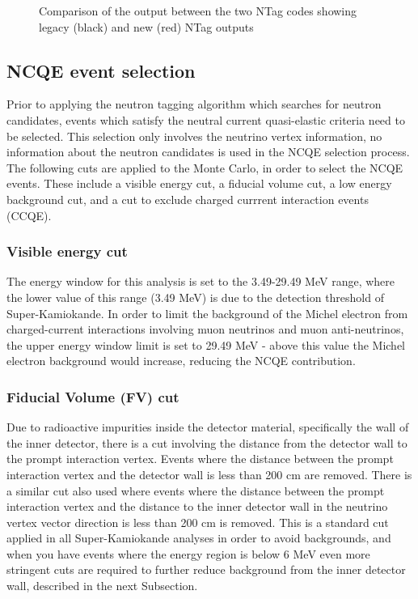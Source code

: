 \begin{figure}[t!]
 
    \caption{Comparison of the output between the two NTag codes showing legacy (black) and new (red) NTag outputs}
    
    \end{figure}




\subsection{NCQE event selection}

Prior to applying the neutron tagging algorithm which searches for neutron candidates, events which satisfy the neutral current quasi-elastic criteria need to be selected. This selection only involves the neutrino vertex information, no information about the neutron candidates is used in the NCQE selection process. 
\newline
The following cuts are applied to the Monte Carlo, in order to select the NCQE events. These include a visible energy cut, a fiducial volume cut, a low energy background cut, and a cut to exclude charged currrent interaction events (CCQE). 

\subsubsection{Visible energy cut}
The energy window for this analysis is set to the 3.49-29.49 MeV range, where the lower value of this range (3.49 MeV) is due to the detection threshold of Super-Kamiokande. In order to limit the background of the Michel electron from charged-current interactions involving muon neutrinos and muon anti-neutrinos, the upper energy window limit is set to 29.49 MeV - above this value the Michel electron background would increase, reducing the NCQE contribution. 

\subsubsection{Fiducial Volume (FV) cut}
Due to radioactive impurities inside the detector material, specifically the wall of the inner detector, there is a cut involving the distance from the detector wall to the prompt interaction vertex. Events where the distance between the prompt interaction vertex and the detector wall is less than 200 cm are removed. There is a similar cut also used where events where the distance between the prompt interaction vertex and the distance to the inner detector wall in the neutrino vertex vector direction is less than 200 cm is removed. This is a standard cut applied in all Super-Kamiokande analyses in order to avoid backgrounds, and when you have events where the energy region is below 6 MeV even more stringent cuts are required to further reduce background from the inner detector wall, described in the next Subsection. 

